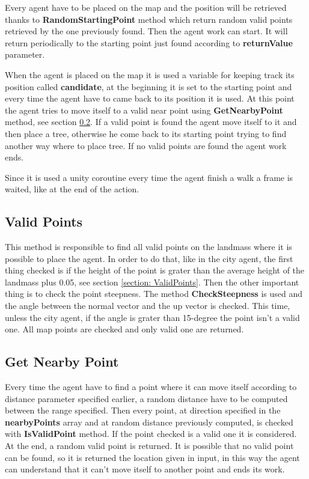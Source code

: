 \documentclass[12pt]{article}
\begin{document}
    Every agent have to be placed on the map and the position will be retrieved thanks to \textbf{RandomStartingPoint} method which return random valid points
    retrieved by the one previously found. Then the agent work can start. It will return periodically to the starting point just found according to \textbf{returnValue} parameter. 

    When the agent is placed on the map it is used a variable for keeping track its position called \textbf{candidate}, at the beginning it is set to the starting point and
    every time the agent have to came back to its position it is used. At this point the agent tries to move itself to a valid near point using \textbf{GetNearbyPoint} method, see section \ref{section:nearbyPoint}.
    If a valid point is found the agent move itself to it and then place a tree, otherwise he come back to its starting point trying to find another way where to place tree. If 
    no valid points are found the agent work ends.

    Since it is used a unity coroutine every time the agent finish a walk a frame is waited, like at the end of the action.

    \subsection{Valid Points} \label{section:validPoints}
    This method is responsible to find all valid points on the landmass where it is possible to place the agent. In order to do that, like in the city agent, the first thing checked 
    is if the height of the point is grater than the average height of the landmass plus 0.05, see section \ref{section: ValidPoints}. Then the other important thing is to check the point
    steepness. The method \textbf{CheckSteepness} is used and the angle between the normal vector and the up vector is checked. This time, unless the city agent, if the angle is grater
    than 15-degree the point isn't a valid one. All map points are checked and only valid one are returned.

    \subsection{Get Nearby Point} \label{section:nearbyPoint}
    Every time the agent have to find a point where it can move itself according to distance parameter specified earlier, a random distance have to be computed between the range specified.
    Then every point, at direction specified in the \textbf{nearbyPoints} array and at random distance previously computed, is checked with \textbf{IsValidPoint} method. If the point 
    checked is a valid one it is considered. At the end, a random valid point is returned. It is possible that no valid point can be found, so it is returned the location given in input,
    in this way the agent can understand that it can't move itself to another point and ends its work.
    
\end{document}
